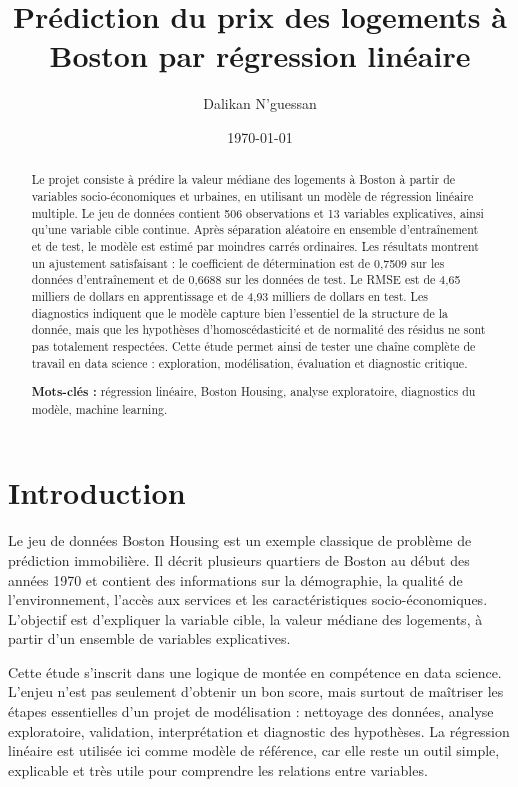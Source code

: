 \documentclass[a4paper,12pt]{article}
\title{\textbf{Prédiction du prix des logements à Boston par régression linéaire}}
\author{Dalikan N'guessan}
\date{\today}
\begin{document}
\maketitle

\begin{abstract}
Le projet consiste à prédire la valeur médiane des logements à Boston à partir de variables socio-économiques et urbaines, en utilisant un modèle de régression linéaire multiple. Le jeu de données contient 506 observations et 13 variables explicatives, ainsi qu’une variable cible continue. Après séparation aléatoire en ensemble d’entraînement et de test, le modèle est estimé par moindres carrés ordinaires. Les résultats montrent un ajustement satisfaisant : le coefficient de détermination est de 0,7509 sur les données d’entraînement et de 0,6688 sur les données de test. Le RMSE est de 4,65 milliers de dollars en apprentissage et de 4,93 milliers de dollars en test. Les diagnostics indiquent que le modèle capture bien l’essentiel de la structure de la donnée, mais que les hypothèses d’homoscédasticité et de normalité des résidus ne sont pas totalement respectées. Cette étude permet ainsi de tester une chaîne complète de travail en data science : exploration, modélisation, évaluation et diagnostic critique.

\textbf{Mots-clés : } régression linéaire, Boston Housing, analyse exploratoire, diagnostics du modèle, machine learning.
\end{abstract}

\tableofcontents
\newpage

\section{Introduction}

Le jeu de données Boston Housing est un exemple classique de problème de prédiction immobilière. Il décrit plusieurs quartiers de Boston au début des années 1970 et contient des informations sur la démographie, la qualité de l’environnement, l’accès aux services et les caractéristiques socio-économiques. L’objectif est d’expliquer la variable cible, la valeur médiane des logements, à partir d’un ensemble de variables explicatives.

Cette étude s’inscrit dans une logique de montée en compétence en data science. L’enjeu n’est pas seulement d’obtenir un bon score, mais surtout de maîtriser les étapes essentielles d’un projet de modélisation : nettoyage des données, analyse exploratoire, validation, interprétation et diagnostic des hypothèses. La régression linéaire est utilisée ici comme modèle de référence, car elle reste un outil simple, explicable et très utile pour comprendre les relations entre variables.
\end{document}
